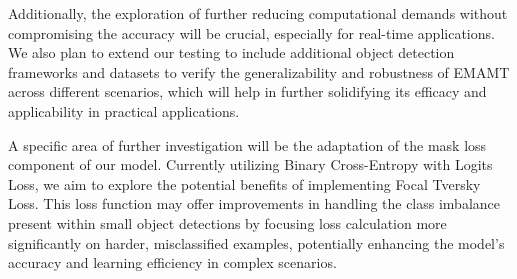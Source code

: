 Additionally, the exploration of further reducing computational demands without compromising the accuracy will be crucial, especially for real-time applications. 
We also plan to extend our testing to include additional object detection frameworks and datasets to verify the generalizability and robustness of EMAMT across 
different scenarios, which will help in further solidifying its efficacy and applicability in practical applications.

A specific area of further investigation will be the adaptation of the mask loss component of our model. Currently utilizing Binary Cross-Entropy with Logits Loss, 
we aim to explore the potential benefits of implementing Focal Tversky Loss. This loss function may offer improvements in handling the class imbalance present 
within small object detections by focusing loss calculation more significantly on harder, misclassified examples, potentially enhancing the model's accuracy and 
learning efficiency in complex scenarios.
